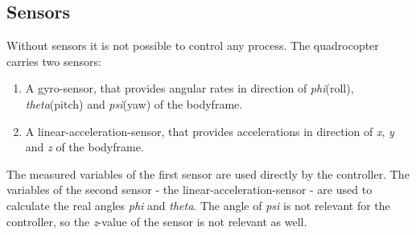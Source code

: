 \subsection{Sensors}\label{chapter_SENSORS}
Without sensors it is not possible to control any process. The quadrocopter carries two sensors:
\begin{enumerate}
	\item A gyro-sensor, that provides angular rates in direction of \textit{phi}(roll), \textit{theta}(pitch) and \textit{psi}(yaw) of the bodyframe. 
	\item A linear-acceleration-sensor, that provides accelerations in direction of \textit{x}, \textit{y} and \textit{z} of the bodyframe.
\end{enumerate}
The measured variables of the first sensor are used directly by the controller. The variables of the second sensor - the linear-acceleration-sensor - are used to calculate the real angles \textit{phi} and \textit{theta}. The angle of \textit{psi} is not relevant for the controller, so the \textit{z}-value of the sensor is not relevant as well.